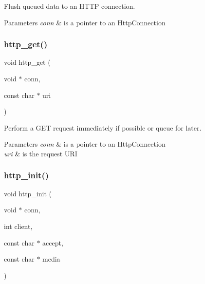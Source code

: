 Flush queued data to an H\+T\+TP connection. 


\begin{DoxyParams}{Parameters}
{\em conn} & is a pointer to an Http\+Connection \\
\hline
\end{DoxyParams}
\mbox{\label{group__http__connection_ga6d911522875a4b99a4172e4a02b78a8a}} 
\subsubsection{\texorpdfstring{http\+\_\+get()}{http\_get()}}
{\footnotesize\ttfamily void http\+\_\+get (\begin{DoxyParamCaption}\item[{void $\ast$}]{conn,  }\item[{const char $\ast$}]{uri }\end{DoxyParamCaption})}



Perform a G\+ET request immediately if possible or queue for later. 


\begin{DoxyParams}{Parameters}
{\em conn} & is a pointer to an Http\+Connection \\
\hline
{\em uri} & is the request U\+RI \\
\hline
\end{DoxyParams}
\mbox{\label{group__http__connection_gaf3fe661f3848c3ce13c987c4f3f72ffb}} 
\subsubsection{\texorpdfstring{http\+\_\+init()}{http\_init()}}
{\footnotesize\ttfamily void http\+\_\+init (\begin{DoxyParamCaption}\item[{void $\ast$}]{conn,  }\item[{int}]{client,  }\item[{const char $\ast$}]{accept,  }\item[{const char $\ast$}]{media }\end{DoxyParamCaption})}



